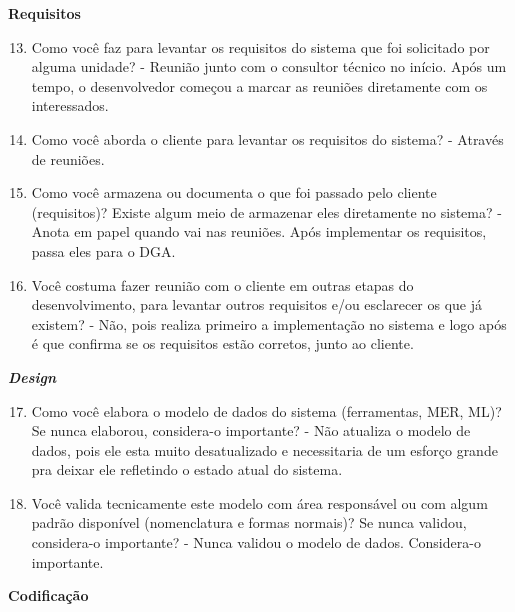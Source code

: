 \begin{anexosenv}
\textbf{Requisitos}

\begin{enumerate}
\setcounter{enumi}{12}
\item Como você faz para levantar os requisitos do sistema que foi solicitado por alguma
unidade?\newline
- Reunião junto com o consultor técnico no início. Após um tempo, o desenvolvedor começou a marcar as reuniões diretamente com os interessados.
\item Como você aborda o cliente para levantar os requisitos do sistema?\newline
- Através de reuniões.
\item Como você armazena ou documenta o que foi passado pelo cliente (requisitos)? Existe
algum meio de armazenar eles diretamente no sistema?\newline
- Anota em papel quando vai nas reuniões. Após implementar os requisitos, passa eles para o DGA.
\item Você costuma fazer reunião com o cliente em outras etapas do desenvolvimento, para
levantar outros requisitos e/ou esclarecer os que já existem?\newline
- Não, pois realiza primeiro a implementação no sistema e logo após é que confirma se os requisitos estão corretos, junto ao cliente.
\end{enumerate}

\textbf{\textit{Design}}

\begin{enumerate}
\setcounter{enumi}{16}
\item Como você elabora o modelo de dados do sistema (ferramentas, MER, ML)? Se nunca
elaborou, considera-o importante?\newline
- Não atualiza o modelo de dados, pois ele esta muito desatualizado e necessitaria de um esforço grande pra deixar ele refletindo o estado atual do sistema.
\item Você valida tecnicamente este modelo com área responsável ou com algum padrão
disponível (nomenclatura e formas normais)? Se nunca validou, considera-o importante?\newline
- Nunca validou o modelo de dados. Considera-o importante.
\end{enumerate}

\textbf{Codificação}


\end{anexosenv}

